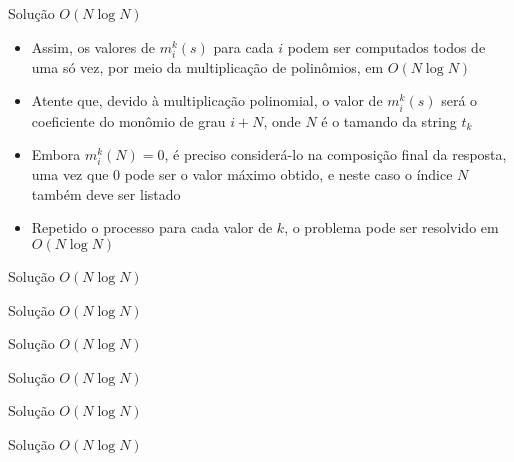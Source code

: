 \begin{frame}[fragile]{Solução $O(N\log N)$}

    \begin{itemize}
        \item Assim, os valores de $m^k_i(s)$ para cada $i$ podem ser computados todos de uma
            só vez, por meio da multiplicação de polinômios, em $O(N\log N)$

        \item Atente que, devido à multiplicação polinomial, o valor de $m^k_i(s)$ será o 
            coeficiente do monômio de grau $i + N$, onde $N$ é o tamando da string $t_k$

        \item Embora $m^k_i(N) = 0$, é preciso considerá-lo na composição final da resposta,
            uma vez que $0$ pode ser o valor máximo obtido, e neste caso o índice $N$ também
            deve ser listado

        \item Repetido o processo para cada valor de $k$, o problema pode ser resolvido em
            $O(N\log N)$
    \end{itemize}

\end{frame}

\begin{frame}[fragile]{Solução $O(N\log N)$}
\end{frame}

\begin{frame}[fragile]{Solução $O(N\log N)$}
\end{frame}

\begin{frame}[fragile]{Solução $O(N\log N)$}
\end{frame}

\begin{frame}[fragile]{Solução $O(N\log N)$}
\end{frame}

\begin{frame}[fragile]{Solução $O(N\log N)$}
\end{frame}

\begin{frame}[fragile]{Solução $O(N\log N)$}
\end{frame}
